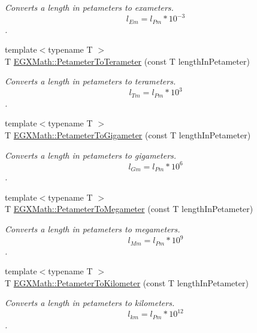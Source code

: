 \begin{DoxyCompactItemize}
\begin{DoxyCompactList}\small\item\em Converts a length in petameters to exameters. \[ l_{Em}=l_{Pm} * 10^{-3} \]. \end{DoxyCompactList}\item 
{\footnotesize template$<$typename T $>$ }\\T \mbox{\hyperlink{group___e_g_x_math-_conversions-_length_conversions-_s_i-_petameter-_s_i_ga49df669a2666aa9681c907ea80e4c34c}{E\+G\+X\+Math\+::\+Petameter\+To\+Terameter}} (const T length\+In\+Petameter)
\begin{DoxyCompactList}\small\item\em Converts a length in petameters to terameters. \[ l_{Tm}=l_{Pm} * 10^{3} \]. \end{DoxyCompactList}\item 
{\footnotesize template$<$typename T $>$ }\\T \mbox{\hyperlink{group___e_g_x_math-_conversions-_length_conversions-_s_i-_petameter-_s_i_ga421403e7220de552c73ae8e3e1edefd1}{E\+G\+X\+Math\+::\+Petameter\+To\+Gigameter}} (const T length\+In\+Petameter)
\begin{DoxyCompactList}\small\item\em Converts a length in petameters to gigameters. \[ l_{Gm}=l_{Pm} * 10^{6} \]. \end{DoxyCompactList}\item 
{\footnotesize template$<$typename T $>$ }\\T \mbox{\hyperlink{group___e_g_x_math-_conversions-_length_conversions-_s_i-_petameter-_s_i_gabee8390ae6476b4718cf82fc87ae7a1e}{E\+G\+X\+Math\+::\+Petameter\+To\+Megameter}} (const T length\+In\+Petameter)
\begin{DoxyCompactList}\small\item\em Converts a length in petameters to megameters. \[ l_{Mm}=l_{Pm} * 10^{9} \]. \end{DoxyCompactList}\item 
{\footnotesize template$<$typename T $>$ }\\T \mbox{\hyperlink{group___e_g_x_math-_conversions-_length_conversions-_s_i-_petameter-_s_i_gadf5a6ef57468284f06662fd7c59ad5ee}{E\+G\+X\+Math\+::\+Petameter\+To\+Kilometer}} (const T length\+In\+Petameter)
\begin{DoxyCompactList}\small\item\em Converts a length in petameters to kilometers. \[ l_{km}=l_{Pm} * 10^{12} \]. \end{DoxyCompactList}\item 

\end{DoxyCompactItemize}
